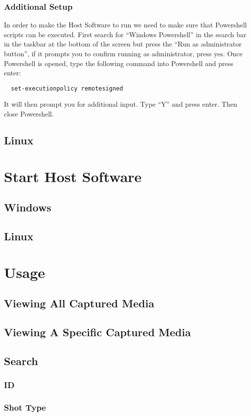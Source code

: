 \documentclass[12pt]{article}
\begin{document}
\subsubsection{Additional Setup}
In order to make the Host Software to run we need to make sure that Powershell scripts can be executed. First search for ``Windows Powershell'' in the search bar in the taskbar at the bottom of the screen but press the ``Run as administrator button'', if it prompts you to confirm running as administrator, press yes. Once Powershell is opened, type the following command into Powershell and press enter:
\begin{verbatim}
  set-executionpolicy remotesigned
\end{verbatim}
It will then prompt you for additional input. Type ``Y'' and press enter. Then close Powershell.
\subsection{Linux}
\section{Start Host Software}
\subsection{Windows}
\subsection{Linux}
\section{Usage}
\subsection{Viewing All Captured Media}
\subsection{Viewing A Specific Captured Media}
\subsection{Search}
\subsubsection{ID}
\subsubsection{Shot Type}
\end{document}

